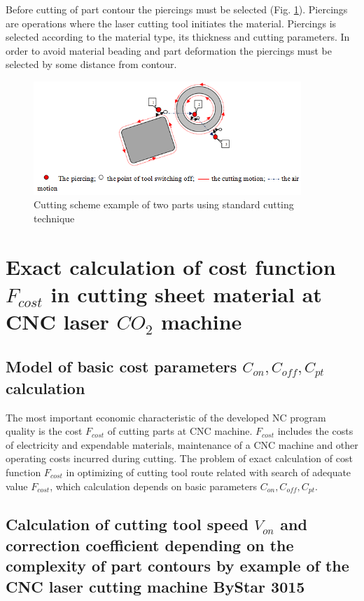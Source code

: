 \documentclass[runningheads]{llncs}
\begin{document}
Before cutting of part contour the piercings must be selected (Fig. \ref{elements}). Piercings are operations where the laser cutting tool initiates the material. Piercings is selected according to the material type, its thickness and cutting parameters. In order to avoid material beading and part deformation the piercings must be selected by some distance from contour.

\begin{figure}
  \begin{center}
  \includegraphics[width=0.9\textwidth]{elements.png}
  \caption{Cutting scheme example of two parts using standard cutting technique}
  \label{elements}
  \end{center}
\end{figure}

\section{Exact calculation of cost function $F_{cost}$ in cutting sheet material at CNC laser $CO_2$ machine}

\subsection{Model of basic cost parameters  $C_{on}, C_{off}, C_{pt}$ calculation}

The most important economic characteristic of the developed NC program quality is the cost $F_{cost}$
of cutting parts at CNC machine.
$F_{cost}$ includes the costs of electricity and expendable materials,
maintenance of a CNC machine and other operating costs incurred during cutting.
The problem of exact calculation of cost function $F_{cost}$
in optimizing of cutting tool route related with search of adequate value  $F_{cost}$,
which calculation depends on basic parameters  $C_{on}, C_{off}, C_{pt}$.

\subsection{Calculation of cutting tool speed $V_{on}$
and correction coefficient depending on the complexity of
part contours by example of the CNC laser cutting machine ByStar 3015}
\end{document}
